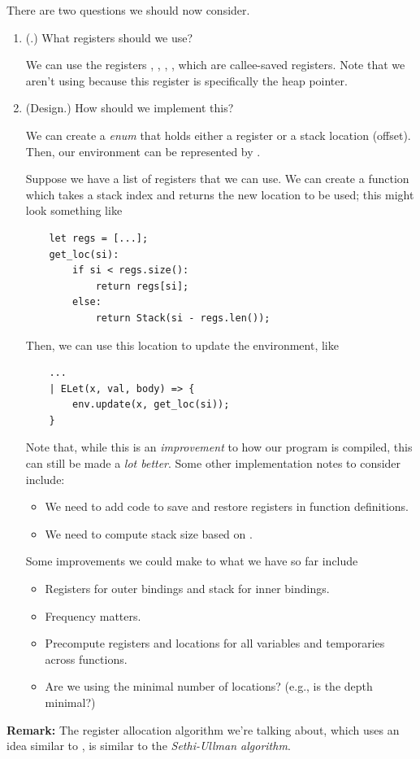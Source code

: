 There are two questions we should now consider.
\begin{enumerate}
    \item (.) What registers should we use?
    \begin{mdframed}
        We can use the registers , , , , which are callee-saved registers. Note that we aren't using  because this register is specifically the heap pointer.
    \end{mdframed}
    \item (Design.) How should we implement this?
    \begin{mdframed}
        We can create a  \emph{enum} that holds either a register or a stack location (offset). Then, our environment can be represented by .

        \bigskip 

        Suppose we have a list of registers that we can use. We can create a  function which takes a stack index and returns the new location to be used; this might look something like 
        \begin{verbatim}
    let regs = [...];
    get_loc(si):
        if si < regs.size():
            return regs[si];
        else:
            return Stack(si - regs.len());\end{verbatim}
        Then, we can use this location to update the environment, like 
        \begin{verbatim}
    ... 
    | ELet(x, val, body) => {
        env.update(x, get_loc(si));
    }\end{verbatim}
        Note that, while this is an \emph{improvement} to how our program is compiled, this can still be made a \emph{lot better}. Some other implementation notes to consider include: 
        \begin{itemize}
            \item We need to add code to save and restore registers in function definitions.
            \item We need to compute stack size based on .
        \end{itemize}
        Some improvements we could make to what we have so far include 
        \begin{itemize}
            \item Registers for outer bindings and stack for inner bindings. 
            \item Frequency matters. 
            \item Precompute registers and locations for all variables and temporaries across functions. 
            \item Are we using the minimal number of locations? (e.g., is the depth minimal?)
        \end{itemize}
    \end{mdframed} 
\end{enumerate}
\textbf{Remark:} The register allocation algorithm we're talking about, which uses an idea similar to , is similar to the \emph{Sethi-Ullman algorithm}.


